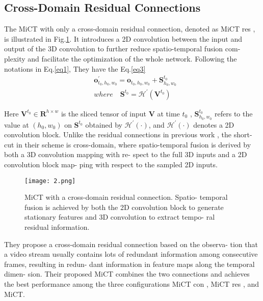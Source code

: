 \documentclass[10pt,twocolumn,letterpaper]{article}
\begin{document}
\subsection{Cross-Domain Residual Connections}
The MiCT with only a cross-domain residual connection,
denoted as MiCT res , is illustrated in Fig.\ref{fig2}. It introduces
a 2D convolution between the input and output of the 3D
convolution to further reduce spatio-temporal fusion com-
plexity and facilitate the optimization of the whole network.
Following the notations in Eq.\ref{eq1}, They have the Eq.\ref{eq3}
\begin{equation}
\begin{aligned}
  &\textbf{o}^\prime_{t_0,h_0,w_0} = \textbf{o}_{t_0,h_0,w_0}+
  \textbf{S}^{t_0}_{h_0,w_0} \\ & where \quad 
  \textbf{S}^{t_0} = \mathcal{H}^\prime\left(\textbf{V}^{t_0}\right)
\end{aligned}
\label{eq3}
\end{equation}
\par
Here $\textbf{V}^{t_0} \in \textbf{R}^{h\times w}$ is the sliced tensor of input \textbf{V} at time
$t_0$ , $\textbf{S}^{t_0}_{h_0,w_0}$ refers to the value at $\left(h_0,w_0\right)$ on $\textbf{S}^{t_0}$ obtained by
$\mathcal{H}^\prime\left(\cdot\right)$, and $\mathcal{H}^\prime\left(\cdot\right)$ denotes a 2D convolution block. Unlike
the residual connections in previous work \cite{he2016deep,feichtenhofer2016spatiotemporal}, the short-
cut in their scheme is cross-domain, where spatio-temporal
fusion is derived by both a 3D convolution mapping with re-
spect to the full 3D inputs and a 2D convolution block map-
ping with respect to the sampled 2D inputs. 
\begin{figure}[t]
	\centering
	\texttt{[image: 2.png]}
	\caption{MiCT with a cross-domain residual connection. Spatio-
		temporal fusion is achieved by both the 2D convolution block to
		generate stationary features and 3D convolution to extract tempo-
		ral residual information.}
	\label{fig2}
\end{figure}
They propose
a cross-domain residual connection based on the observa-
tion that a video stream usually contains lots of redundant
information among consecutive frames, resulting in redun-
dant information in feature maps along the temporal dimen-
sion. Their proposed MiCT combines the two connections and achieves the best performance among
the three configurations MiCT con , MiCT res , and MiCT.
\end{document}
